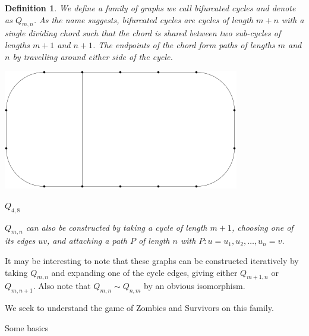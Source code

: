 \documentclass[letterpaper, 10pt]{article}
\begin{document}
\newtheorem{definition}{Definition}
\newtheorem{theorem}{Theorem}
\newtheorem{proposition}{Proposition}
\newtheorem{corollary}{Corollary}
\newtheorem{lemma}{Lemma}

\begin{definition}
We define a family of graphs we call \emph{bifurcated cycles} and denote as $Q_{m,n}$.
As the name suggests, bifurcated cycles are cycles of length $m+n$ with a single dividing chord such that the
chord is shared between two sub-cycles of lengths $m+1$ and $n+1$. The endpoints of the
chord form paths of lengths $m$ and $n$ by travelling around either side of the cycle.
\begin{center}
\includegraphics[scale=0.35]{Q_4,8}

$Q_{4,8}$
\end{center}
$Q_{m,n}$ can also be constructed by taking a cycle of length $m+1$, choosing one of its edges $uv$, and attaching
a path $P$ of length $n$ with $P : u = u_1, u_2, \dots, u_n = v$.
\end{definition}

It may be interesting to note that these graphs can be constructed iteratively by taking $Q_{m,n}$ and expanding
one of the cycle edges, giving either $Q_{m+1, n}$ or $Q_{m,n+1}$. Also note that $Q_{m,n} \sim Q_{n,m}$ by
an obvious isomorphism.

We seek to understand the game of Zombies and Survivors on this family.

Some basics
\end{document}
